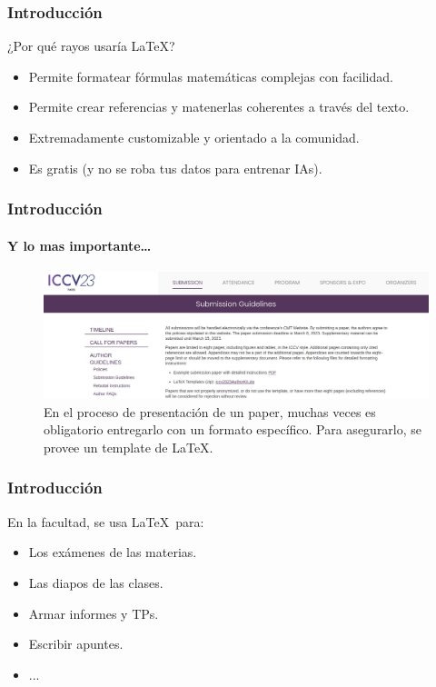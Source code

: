 \begin{frame}
    \frametitle{Introducción}
    \begin{tcolorbox}[colframe=color1]
        \begin{center}
            ¿Por qué rayos usaría \LaTeX ?
        \end{center}
    \end{tcolorbox}

    \begin{itemize}
        \item Permite formatear fórmulas matemáticas complejas con facilidad.
        \item Permite crear referencias y matenerlas coherentes a través del texto.
        \item Extremadamente customizable y orientado a la comunidad.
        \item Es gratis (y no se roba tus datos para entrenar IAs).
    \end{itemize}
\end{frame}

\begin{frame}
    \frametitle{Introducción}
    \framesubtitle{Y lo mas importante\dots}
    \begin{figure}[h]
        \centering
        \includegraphics[width=\textwidth]{../images/submission.png}
        \caption{En el proceso de presentación de un paper, muchas veces es obligatorio entregarlo con un formato específico. Para asegurarlo, se provee un template de \LaTeX.}
    \end{figure}
\end{frame}

\begin{frame}
\frametitle{Introducción}
    En la facultad, se usa \LaTeX\ para:
    \begin{itemize}
    \item Los exámenes de las materias.
    \item Las diapos de las clases.
    \item Armar informes y TPs.
    \item Escribir apuntes.
    \item ...
    \end{itemize}
\end{frame}
